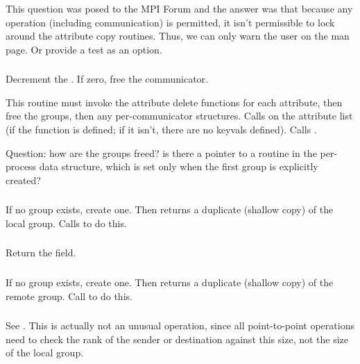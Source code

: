 \documentclass{article}
\begin{document}
This question was posed to the MPI Forum and the answer was that
because any operation (including communication) is permitted, it isn't
permissible to lock around the attribute copy routines.  Thus, we can
only warn the user on the man page.  Or provide a test as an option.

\subsubsection{}
Decrement the .  If zero, free the
communicator.

This routine must invoke the attribute delete functions for each
attribute, then free the groups, then any per-communicator
structures.  
Calls  on the attribute list (if
the function is defined; if it isn't, there are no keyvals defined).
Calls .

Question: how are the groups freed?  is there a pointer to a
 routine in the per-process data structure, which is
set only when the first group is explicitly created?

\subsubsection{}
If no group exists, create one.  Then 
returns a duplicate (shallow copy) of the local group.  Calls
 to do this. 

\subsubsection{}
Return the  field.

\subsubsection{}
If no group exists, create one.  Then
returns a duplicate (shallow copy) of the remote group.  Call
 to do this.

\subsubsection{}
See .  This is actually not an unusual operation,
since all point-to-point operations need to check the rank of the
sender or destination against this size, not the size of the local
group.  
\end{document}

